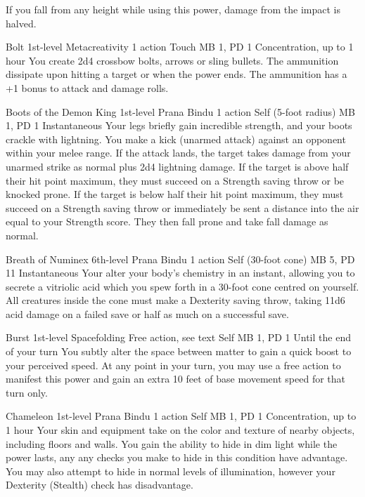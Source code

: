 If you fall from any height while using this power,
damage from the impact is halved.

\DndPowerHeader%
  {Bolt}
  {1st-level Metacreativity}
  {1 action}
  {Touch}
  {MB 1, PD 1}
  {Concentration, up to 1 hour}
You create 2d4 crossbow bolts, arrows or sling bullets.
The ammunition dissipate upon hitting a target
or when the power ends.
The ammunition has a +1 bonus to attack and damage rolls.

\DndPowerHeader%
  {Boots of the Demon King}
  {1st-level Prana Bindu}
  {1 action}
  {Self (5-foot radius)}
  {MB 1, PD 1}
  {Instantaneous}
Your legs briefly gain incredible strength,
and your boots crackle with lightning.
You make a kick (unarmed attack) against an
opponent within your melee range.
If the attack lands,
the target takes damage from your unarmed strike
as normal plus 2d4 lightning damage.
If the target is above half their hit point maximum,
they must succeed on a Strength saving throw or be knocked prone.
If the target is below half their hit point maximum,
they must succeed on a Strength saving throw or immediately
be sent a distance into the air equal to your Strength score.
They then fall prone and take fall damage as normal.

\DndPowerHeader%
  {Breath of Numinex}
  {6th-level Prana Bindu}
  {1 action}
  {Self (30-foot cone)}
  {MB 5, PD 11}
  {Instantaneous}
Your alter your body's chemistry in an instant,
allowing you to secrete a vitriolic acid
which you spew forth in a 30-foot cone
centred on yourself.
All creatures inside the cone must make a
Dexterity saving throw,
taking 11d6 acid damage on a failed save
or half as much on a successful save. 

\DndPowerHeader%
  {Burst}
  {1st-level Spacefolding}
  {Free action, see text}
  {Self}
  {MB 1, PD 1}
  {Until the end of your turn}
You subtly alter the space between matter
to gain a quick boost to your perceived speed.
At any point in your turn,
you may use a free action to manifest this power
and gain an extra 10 feet of base movement speed
for that turn only.

\DndPowerHeader%
  {Chameleon}
  {1st-level Prana Bindu}
  {1 action}
  {Self}
  {MB 1, PD 1}
  {Concentration, up to 1 hour}
  Your skin and equipment take on the color and texture
  of nearby objects,
  including floors and walls.
  You gain the ability to hide in dim light
  while the power lasts,
  any any checks you make to hide in this
  condition have advantage.
  You may also attempt to hide in normal levels
  of illumination,
  however your Dexterity (Stealth) check has disadvantage.


